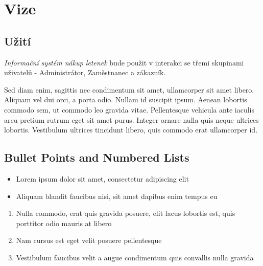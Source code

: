 \documentclass[
paper=landscape,
paper=160mm:90mm, %
fontsize=11pt, %
pagesize, %
parskip=half-, %
]{scrartcl} %
\newcommand*{\mygreen}[1]{\textcolor{mygreen}{#1}}
\newcommand*{\myblue}[1]{\textcolor{myblue}{#1}}
\newcommand*{\mybrown}[1]{\textcolor{mybrown}{#1}}
\newcommand*{\myred}[1]{\textcolor{myred}{#1}}
\theoremstyle{mythmstyle} %
\begin{document}
\section{Vize}

\clearpage


\subsection{Užití}

\textit{Informační systém nákup letenek} bude použit v interakci se třemi skupinami uživatelů - Administrátor, Zaměstnanec a zákazník. 

\begin{multicols}{3} %
\mygreen{Sed diam enim, sagittis nec} condimentum sit amet, ullamcorper sit amet libero. \mybrown{Aliquam vel dui orci}, a porta odio. \myred{Nullam id suscipit} ipsum. \myblue{Aenean lobortis} commodo sem, ut commodo leo gravida vitae. Pellentesque vehicula ante iaculis arcu pretium rutrum eget sit amet purus. Integer ornare nulla quis neque ultrices lobortis. Vestibulum ultrices tincidunt libero, quis commodo erat ullamcorper id.
\end{multicols}

\clearpage


\subsection{Bullet Points and Numbered Lists}

\begin{itemize}
\item Lorem ipsum dolor sit amet, consectetur adipiscing elit
\item Aliquam blandit faucibus nisi, sit amet dapibus enim tempus eu
\end{itemize}

\begin{enumerate}
\item Nulla commodo, erat quis gravida posuere, elit lacus lobortis est, quis porttitor odio mauris at libero
\item Nam cursus est eget velit posuere pellentesque
\item Vestibulum faucibus velit a augue condimentum quis convallis nulla gravida
\end{enumerate}
\end{document}
